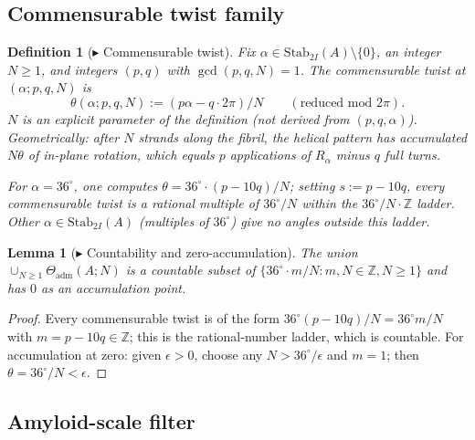 \documentclass[12pt]{article}
\newtheorem{definition}[theorem]{Definition}
\newtheorem{lemma}[theorem]{Lemma}
\newcommand{\Stab}{\mathrm{Stab}}
\begin{document}
\subsection{Commensurable twist family}

\begin{definition}[$\blacktriangleright$ Commensurable twist]\label{def:D2}
Fix $\alpha \in \Stab_{2I}(A) \setminus \{0\}$, an integer
$N \ge 1$, and integers $(p, q)$ with $\gcd(p, q, N) = 1$. The
\emph{commensurable twist at $(\alpha; p, q, N)$} is
\[
\theta(\alpha; p, q, N) := (p \alpha - q \cdot 2\pi) / N
\qquad (\text{reduced mod } 2\pi).
\]
$N$ is an explicit parameter of the definition (not derived from
$(p, q, \alpha)$). Geometrically: after $N$ strands along the
fibril, the helical pattern has accumulated $N\theta$ of
in-plane rotation, which equals $p$ applications of $R_\alpha$
minus $q$ full turns.

For $\alpha = 36^{\circ}$, one computes
$\theta = 36^{\circ} \cdot (p - 10q)/N$; setting $s := p - 10q$,
every commensurable twist is a rational multiple of
$36^{\circ}/N$ within the $36^{\circ}/N \cdot \mathbb{Z}$ ladder.
Other $\alpha \in \Stab_{2I}(A)$ (multiples of $36^{\circ}$) give
no angles outside this ladder.
\end{definition}

\begin{lemma}[$\blacktriangleright$ Countability and zero-accumulation]\label{lem:L2}
The union $\cup_{N \ge 1} \Theta_{\mathrm{adm}}(A; N)$ is a
countable subset of $\{36^{\circ} \cdot m/N : m, N \in \mathbb{Z},
N \ge 1\}$ and has $0$ as an accumulation point.
\end{lemma}

\begin{proof}
Every commensurable twist is of the form $36^{\circ}(p-10q)/N =
36^{\circ}m/N$ with $m = p - 10q \in \mathbb{Z}$; this is the
rational-number ladder, which is countable. For accumulation at
zero: given $\epsilon > 0$, choose any $N > 36^{\circ}/\epsilon$
and $m = 1$; then $\theta = 36^{\circ}/N < \epsilon$.
\end{proof}

\subsection{Amyloid-scale filter}
\end{document}
